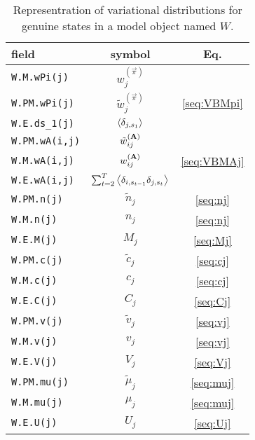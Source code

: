 \documentclass[11pt,letterpaper,twocolumn]{article}
\begin{document}
\begin{table}
\caption{Representration of variational distributions for genuine
  states in a model object named $W$.}\label{tab:Qparameters}
\begin{center}\begin{tabular}{|l|c|c|}
    \hline
    field & symbol & Eq.\\
    \hline\hline
    \verb+W.M.wPi(j)+& $ w_j^{(\vec{\pi})}$    & \\ 
    \verb+W.PM.wPi(j)+& $\tilde w_j^{(\vec{\pi})}$    & \eqref{seq:VBMpi}\\ 
    \verb+W.E.ds_1(j)+& $\left\langle \delta_{j,s_1}\right\rangle$ & \\ 
    \hline
    
    \verb+W.PM.wA(i,j)+& $\tilde w_{ij}^{(\mathbf{A})}$& \\ 
    \verb+W.M.wA(i,j)+& $w_{ij}^{(\mathbf{A})}$& \eqref{seq:VBMAj}\\ 
    \verb+W.E.wA(i,j)+& $\sum_{t=2}^T\left\langle \delta_{i,s_{t-1}}\delta_{j,s_t}\right\rangle$
    & \\ 
    \hline
    \verb+W.PM.n(j)+& $\tilde n_j$& \eqref{seq:nj}\\ 
    \verb+W.M.n(j)+& $n_j$& \eqref{seq:nj}\\ 
    \verb+W.E.M(j)+& $M_j$& \eqref{seq:Mj}\\ 
    \hline
    \verb+W.PM.c(j)+& $\tilde c_j$& \eqref{seq:cj}\\ 
    \verb+W.M.c(j)+& $c_j$& \eqref{seq:cj}\\ 
    \verb+W.E.C(j)+& $C_j$&\eqref{seq:Cj}\\
    \hline
    \verb+W.PM.v(j)+& $\tilde v_j$& \eqref{seq:vj}\\ 
    \verb+W.M.v(j)+& $v_j$& \eqref{seq:vj}\\ 
    \verb+W.E.V(j)+& $V_j$& \eqref{seq:Vj}\\ 
    \hline
    \verb+W.PM.mu(j)+& $\tilde \mu_j$& \eqref{seq:muj}\\
    \verb+W.M.mu(j)+& $\mu_j$& \eqref{seq:muj}\\  
    \verb+W.E.U(j)+& $U_j$&\eqref{seq:Uj}\\
    \hline
  \end{tabular}\end{center}\end{table}
\end{document}
